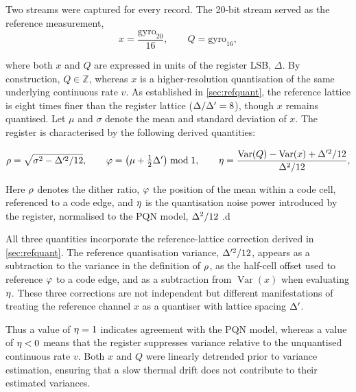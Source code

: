 Two streams were captured for every record. The 20-bit stream served as the reference measurement,
\begin{equation}
  x = \frac{\mathrm{gyro}_{20}}{16},
  \qquad Q = \mathrm{gyro}_{16},
  \label{eq:streams}
\end{equation}

where both $x$ and $Q$ are expressed in units of the register LSB, $\Delta$. By construction, $Q \in \mathbb{Z}$, whereas $x$ is a higher-resolution quantisation of the same underlying continuous rate $v$. As established in \cref{sec:refquant}, the reference lattice is eight times finer than the register lattice ($\Delta/\Delta' = 8$), though $x$ remains quantised. Let $\mu$ and $\sigma$ denote the mean and standard deviation of $x$. The register is characterised by the following derived quantities:

\begin{equation}
  \rho = \sqrt{\sigma^{2} - \Delta'^{2}/12}, \qquad
  \varphi = \left(\mu + \tfrac{1}{2}\Delta'\right) \bmod 1, \qquad
  \eta = \frac{\operatorname{Var}(Q) - \operatorname{Var}(x) + \Delta'^{2}/12}
               {\Delta^{2}/12},
  \label{eq:quantities}
\end{equation}

Here $\rho$ denotes the dither ratio, $\varphi$ the position of the mean within a code cell, referenced to a code edge, and $\eta$ is the quantisation noise power introduced by the register, normalised to the PQN model, $\Delta^{2}/12$ .d

All three quantities incorporate the reference-lattice correction derived in \cref{sec:refquant}. The reference quantisation variance, $\Delta'^{2}/12$, appears as a subtraction to the variance in the definition of $\rho$, as the half-cell offset used to reference $\varphi$ to a code edge, and as a subtraction from $\operatorname{Var}(x)$ when evaluating $\eta$. These three corrections are not independent but different manifestations of treating the reference channel $x$ as a quantiser with lattice spacing $\Delta'$.

Thus a value of $\eta = 1$ indicates agreement with the PQN model, whereas a value of $\eta < 0$ means that the register suppresses variance relative to the unquantised continuous rate $v$. Both $x$ and $Q$ were linearly detrended prior to variance estimation, ensuring that a slow thermal drift does not contribute to their estimated variances.



